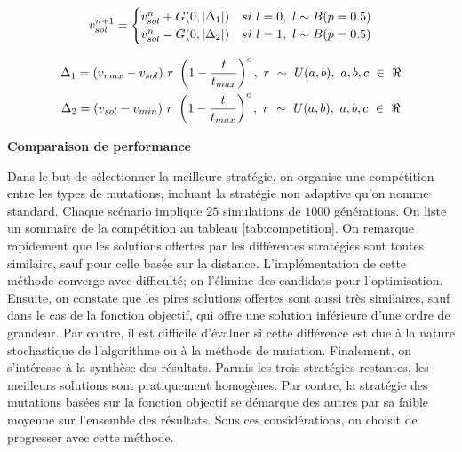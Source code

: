 \documentclass{article}
\DeclarePairedDelimiter\absol{\lvert}{\rvert}%
\begin{document}
\begin{equation}\label{eq:nu}
	v^{n+1}_{sol} = \begin{cases}
					v^{n}_{sol} + G(0, \absol{\Delta_1}) & si\ l=0,\ l \sim B(p=0.5)\\
					v^{n}_{sol} - G(0, \absol{\Delta_2}) & si\ l=1,\ l \sim B(p=0.5)\\
					\end{cases}  
\end{equation}

\begin{equation}\label{eq:delta}
	\begin{gathered}
		\Delta_1  = (v_{max} - v_{sol})\ r\ \left(1-\frac{t}{t_{max}}\right)^c,\ r\ \sim\ U(a,b),\ a,b,c\ \in\ \real \\
		\Delta_2  = (v_{sol} - v_{min})\ r\ \left(1-\frac{t}{t_{max}}\right)^c,\ r\ \sim\ U(a,b),\ a,b,c\ \in\ \real
	\end{gathered}
\end{equation}


\vspace{0.3cm}
\noindent\textbf{Comparaison de performance}

Dans le but de sélectionner la meilleure stratégie, on organise une compétition entre les types de mutations, incluant la stratégie non adaptive qu'on nomme standard. Chaque scénario implique $25$ simulations de $1000$ générations. On liste un sommaire de la compétition au tableau \ref{tab:competition}. On remarque rapidement que les solutions offertes par les différentes stratégies sont toutes similaire, sauf pour celle basée sur la distance. L'implémentation de cette méthode converge avec difficulté; on l'élimine des candidats pour l'optimisation. Ensuite, on constate que les pires solutions offertes sont aussi très similaires, sauf dans le cas de la fonction objectif, qui offre une solution inférieure d'une ordre de grandeur. Par contre, il est difficile d'évaluer si cette différence est due à la nature stochastique de l'algorithme ou à la méthode de mutation. Finalement, on s'intéresse à la synthèse des résultats. Parmis les trois stratégies restantes, les meilleurs solutions sont pratiquement homogènes. Par contre, la stratégie des mutations basées sur la fonction objectif se démarque des autres par sa faible moyenne sur l'ensemble des résultats. Sous ces considérations, on choisit de progresser avec cette méthode.
\end{document}
